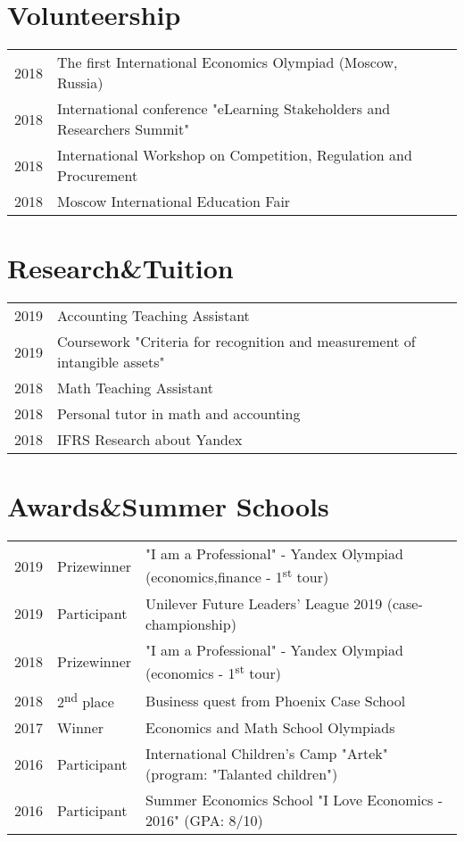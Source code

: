 \documentclass[]{deedy-resume-openfont}
\begin{document}
\begin{minipage}[t]{0.66\textwidth}

\section{Volunteership}
\location{\\ \\ }
\begin{tabular}{rll}
2018    &  The first International Economics Olympiad (Moscow, Russia) \\
2018   & International conference "eLearning Stakeholders and Researchers Summit" \\
2018 & International Workshop on Competition, Regulation and
Procurement \\
2018  & Moscow International Education Fair
\end{tabular}
\sectionsep

\section{Research\&Tuition} 

\begin{tabular}{rll}
2019 	& Accounting Teaching Assistant\\
2019   & Coursework "Criteria for recognition and measurement of intangible assets"\\
2018   &  Math Teaching Assistant\\
2018   &  Personal tutor in math and accounting\\
2018   &  IFRS Research about Yandex
\end{tabular}
\sectionsep


\section{Awards\&Summer Schools} 
\begin{tabular}{rll}
2019	     & Prizewinner  & "I am a Professional" - Yandex Olympiad (economics,finance - 1\textsuperscript{st} tour)\\
2019         & Participant  & Unilever Future Leaders' League 2019 (case-championship)\\
2018	     & Prizewinner  & "I am a Professional" - Yandex Olympiad (economics - 1\textsuperscript{st} tour)\\
2018	     & 2\textsuperscript{nd} place  & Business quest from Phoenix Case School\\
2017	     & Winner  & Economics and Math School Olympiads\\
2016	     & Participant  & International Children's Camp "Artek" (program: "Talanted children")\\
2016         & Participant &Summer Economics School "I Love Economics - 2016" (GPA: 8/10)
\end{tabular}
\sectionsep




\end{minipage} 
\end{document}
